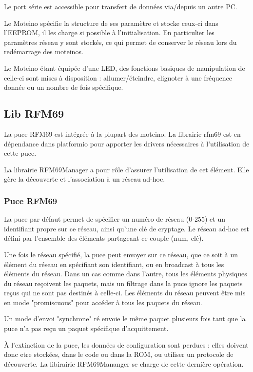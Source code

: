 \documentclass[a4paper]{report}
\begin{document}
Le port série est accessible pour transfert de données via/depuis un autre PC.

Le Moteino spécifie la structure de ses paramètre et stocke ceux-ci dans l'EEPROM, il les charge si possible à l'initialisation. En particulier les paramètres réseau y sont stockés, ce qui permet de conserver le réseau lors du redémarrage des moteinos.

Le Moteino étant équipée d'une LED, des fonctions basiques de manipulation de celle-ci sont mises à disposition : allumer/éteindre, clignoter à une fréquence donnée ou un nombre de fois spécifique.

\subsection{Lib RFM69}

La puce RFM69 est intégrée à la plupart des moteino. La librairie rfm69 est en dépendance dans platformio pour apporter les drivers nécessaires à l'utilisation de cette puce.

La librairie RFM69Manager a pour rôle d'assurer l'utilisation de cet élément. Elle  gère la découverte et l'association à un réseau ad-hoc.

\subsubsection{Puce RFM69}

La puce par défaut permet de spécifier un numéro de réseau (0-255) et un identifiant propre sur ce réseau, ainsi qu'une clé de cryptage. Le réseau ad-hoc est défini par l'ensemble des éléments partageant ce couple (num, clé).

Une fois le réseau spécifié, la puce peut envoyer sur ce réseau, que ce soit à un élément du réseau en spécifiant son identifiant, ou en broadcast à tous les éléments du réseau. Dans un cas comme dans l'autre, tous les éléments physiques du réseau reçoivent les paquets, mais un filtrage dans la puce ignore les paquets reçus qui ne sont pas destinés à celle-ci. Les éléments du réseau peuvent être mis en mode "promiscuous" pour accéder à tous les paquets du réseau.

Un mode d'envoi "synchrone" ré envoie le même paquet plusieurs fois tant que la puce n'a pas reçu un paquet spécifique d'acquittement.

À l'extinction de la puce, les données de configuration sont perdues : elles doivent donc etre stockées, dans le code ou dans la ROM, ou utiliser un protocole de découverte. La libirairie RFM69Mananger se charge de cette dernière opération.
\end{document}
